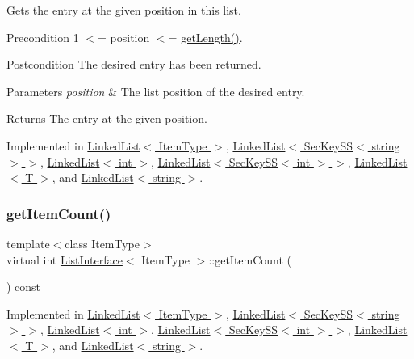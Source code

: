 Gets the entry at the given position in this list. \begin{DoxyPrecond}{Precondition}
1 $<$= position $<$= \hyperlink{classListInterface_afc85695d4137f1e29ff02e179c9f3221}{get\+Length()}. 
\end{DoxyPrecond}
\begin{DoxyPostcond}{Postcondition}
The desired entry has been returned. 
\end{DoxyPostcond}

\begin{DoxyParams}{Parameters}
{\em position} & The list position of the desired entry. \\
\hline
\end{DoxyParams}
\begin{DoxyReturn}{Returns}
The entry at the given position. 
\end{DoxyReturn}


Implemented in \hyperlink{classLinkedList_a341bfd7772c9d24d29eb7a7f3936915b}{Linked\+List$<$ Item\+Type $>$}, \hyperlink{classLinkedList_a341bfd7772c9d24d29eb7a7f3936915b}{Linked\+List$<$ Sec\+Key\+S\+S$<$ string $>$ $>$}, \hyperlink{classLinkedList_a341bfd7772c9d24d29eb7a7f3936915b}{Linked\+List$<$ int $>$}, \hyperlink{classLinkedList_a341bfd7772c9d24d29eb7a7f3936915b}{Linked\+List$<$ Sec\+Key\+S\+S$<$ int $>$ $>$}, \hyperlink{classLinkedList_a341bfd7772c9d24d29eb7a7f3936915b}{Linked\+List$<$ T $>$}, and \hyperlink{classLinkedList_a341bfd7772c9d24d29eb7a7f3936915b}{Linked\+List$<$ string $>$}.

\mbox{\label{classListInterface_a3e085e6ea9c5dc3e8007010cd889159c}} 
\subsubsection{\texorpdfstring{get\+Item\+Count()}{getItemCount()}}
{\footnotesize\ttfamily template$<$class Item\+Type$>$ \\
virtual int \hyperlink{classListInterface}{List\+Interface}$<$ Item\+Type $>$\+::get\+Item\+Count (\begin{DoxyParamCaption}{ }\end{DoxyParamCaption}) const\hspace{0.3cm}{\ttfamily [pure virtual]}}



Implemented in \hyperlink{classLinkedList_afc6635f854f48f2f126cf3b60d845220}{Linked\+List$<$ Item\+Type $>$}, \hyperlink{classLinkedList_afc6635f854f48f2f126cf3b60d845220}{Linked\+List$<$ Sec\+Key\+S\+S$<$ string $>$ $>$}, \hyperlink{classLinkedList_afc6635f854f48f2f126cf3b60d845220}{Linked\+List$<$ int $>$}, \hyperlink{classLinkedList_afc6635f854f48f2f126cf3b60d845220}{Linked\+List$<$ Sec\+Key\+S\+S$<$ int $>$ $>$}, \hyperlink{classLinkedList_afc6635f854f48f2f126cf3b60d845220}{Linked\+List$<$ T $>$}, and \hyperlink{classLinkedList_afc6635f854f48f2f126cf3b60d845220}{Linked\+List$<$ string $>$}.


